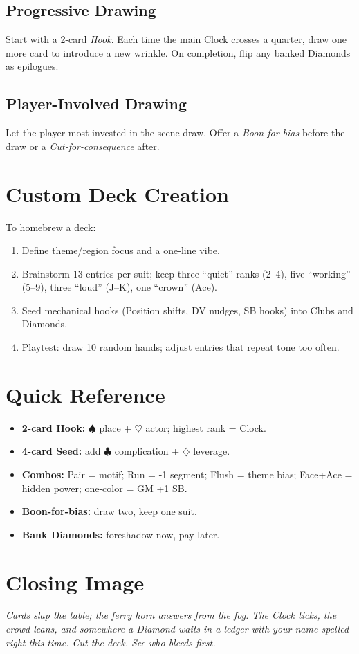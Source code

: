 \begin{multicols}{2}
\subsection*{Progressive Drawing}
Start with a 2-card \emph{Hook}. Each time the main Clock crosses a quarter, draw one more card to introduce a new wrinkle. On completion, flip any banked Diamonds as epilogues.

\subsection*{Player-Involved Drawing}
Let the player most invested in the scene draw. Offer a \emph{Boon-for-bias} before the draw or a \emph{Cut-for-consequence} after.

\section{Custom Deck Creation}
To homebrew a deck:
\begin{enumerate}
  \item Define theme/region focus and a one-line vibe.
  \item Brainstorm 13 entries per suit; keep three “quiet” ranks (2–4), five “working” (5–9), three “loud” (J–K), one “crown” (Ace).
  \item Seed mechanical hooks (Position shifts, DV nudges, SB hooks) into Clubs and Diamonds.
  \item Playtest: draw 10 random hands; adjust entries that repeat tone too often.
\end{enumerate}

\section*{Quick Reference}
\begin{tcolorbox}[colback=green!5!white,colframe=green!60!black,title=Deck Generators at a Glance,fonttitle=\bfseries]
\begin{itemize}
  \item \textbf{2-card Hook:} \(\spadesuit\) place + \(\heartsuit\) actor; highest rank = Clock.
  \item \textbf{4-card Seed:} add \(\clubsuit\) complication + \(\diamondsuit\) leverage.
  \item \textbf{Combos:} Pair = motif; Run = -1 segment; Flush = theme bias; Face+Ace = hidden power; one-color = GM +1 SB.
  \item \textbf{Boon-for-bias:} draw two, keep one suit.
  \item \textbf{Bank Diamonds:} foreshadow now, pay later.
\end{itemize}
\end{tcolorbox}

\section*{Closing Image}
\textit{Cards slap the table; the ferry horn answers from the fog. The Clock ticks, the crowd leans, and somewhere a Diamond waits in a ledger with your name spelled right this time. Cut the deck. See who bleeds first.}

\end{multicols}
